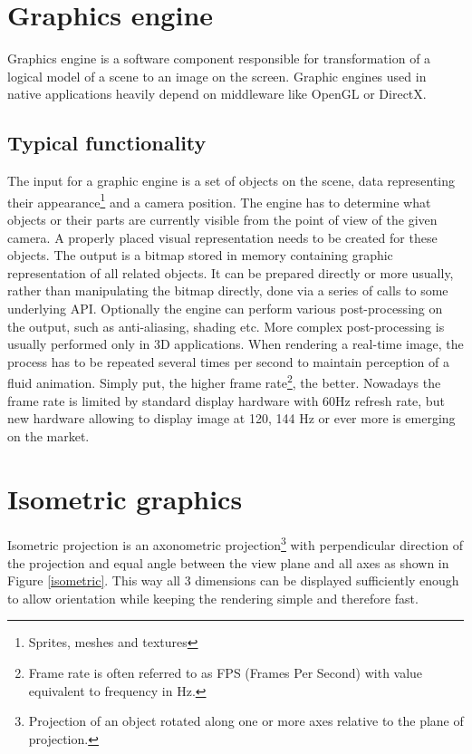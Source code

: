 \documentclass[11pt,oneside, final]{fithesis2}
\begin{document}
\section{Graphics engine}
Graphics engine is a software component responsible for transformation of a logical model of a scene to an image on the screen. Graphic engines used in native applications heavily depend on middleware like OpenGL or DirectX\cite{gregory}.

\subsection{Typical functionality}
The input for a graphic engine is a set of objects on the scene, data representing their appearance\footnote{Sprites, meshes and textures} and a camera position. The engine has to determine what objects or their parts are currently visible from the point of view of the given camera. A properly placed visual representation needs to be created for these objects. The output is a bitmap stored in memory containing graphic representation of all related objects. It can be prepared directly or more usually, rather than manipulating the bitmap directly, done via a series of calls to some underlying API. Optionally the engine can perform various post-processing on the output, such as anti-aliasing, shading etc.\cite{gregory} More complex post-processing is usually performed only in 3D applications. When rendering a real-time image, the process has to be repeated several times per second to maintain perception of a fluid animation. Simply put, the higher frame rate\footnote{Frame rate is often referred to as FPS (Frames Per Second) with value equivalent to frequency in Hz.}, the better\cite{claypool}. Nowadays the frame rate is limited by standard display hardware with 60Hz refresh rate, but new hardware allowing to display image at 120, 144 Hz or ever more is emerging on the market.

\section{Isometric graphics}
Isometric projection is an axonometric projection\footnote{Projection of an object rotated along one or more axes relative to the plane of projection\cite{maynard}.} with perpendicular direction of the projection and equal angle between the view plane and all axes\cite{desai} as shown in Figure \ref{isometric}. This way all 3 dimensions can be displayed sufficiently enough to allow orientation while keeping the rendering simple and therefore fast. 
\end{document}
